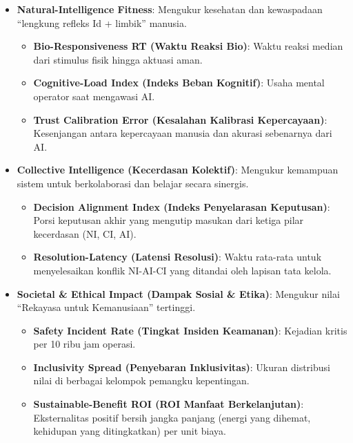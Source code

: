 \documentclass[
  letterpaper,
  DIV=11,
  numbers=noendperiod]{scrreprt}
\providecommand{\tightlist}{%
  \setlength{\itemsep}{0pt}\setlength{\parskip}{0pt}}
\begin{document}
\begin{itemize}
\tightlist
\item
  \textbf{Natural-Intelligence Fitness}: Mengukur kesehatan dan
  kewaspadaan ``lengkung refleks Id + limbik'' manusia.

  \begin{itemize}
  \tightlist
  \item
    \textbf{Bio-Responsiveness RT (Waktu Reaksi Bio)}: Waktu reaksi
    median dari stimulus fisik hingga aktuasi aman.
  \item
    \textbf{Cognitive-Load Index (Indeks Beban Kognitif)}: Usaha mental
    operator saat mengawasi AI.
  \item
    \textbf{Trust Calibration Error (Kesalahan Kalibrasi Kepercayaan)}:
    Kesenjangan antara kepercayaan manusia dan akurasi sebenarnya dari
    AI.
  \end{itemize}
\item
  \textbf{Collective Intelligence (Kecerdasan Kolektif)}: Mengukur
  kemampuan sistem untuk berkolaborasi dan belajar secara sinergis.

  \begin{itemize}
  \tightlist
  \item
    \textbf{Decision Alignment Index (Indeks Penyelarasan Keputusan)}:
    Porsi keputusan akhir yang mengutip masukan dari ketiga pilar
    kecerdasan (NI, CI, AI).
  \item
    \textbf{Resolution-Latency (Latensi Resolusi)}: Waktu rata-rata
    untuk menyelesaikan konflik NI-AI-CI yang ditandai oleh lapisan tata
    kelola.
  \end{itemize}
\item
  \textbf{Societal \& Ethical Impact (Dampak Sosial \& Etika)}: Mengukur
  nilai ``Rekayasa untuk Kemanusiaan'' tertinggi.

  \begin{itemize}
  \tightlist
  \item
    \textbf{Safety Incident Rate (Tingkat Insiden Keamanan)}: Kejadian
    kritis per 10 ribu jam operasi.
  \item
    \textbf{Inclusivity Spread (Penyebaran Inklusivitas)}: Ukuran
    distribusi nilai di berbagai kelompok pemangku kepentingan.
  \item
    \textbf{Sustainable-Benefit ROI (ROI Manfaat Berkelanjutan)}:
    Eksternalitas positif bersih jangka panjang (energi yang dihemat,
    kehidupan yang ditingkatkan) per unit biaya.
  \end{itemize}
\end{itemize}
\end{document}
